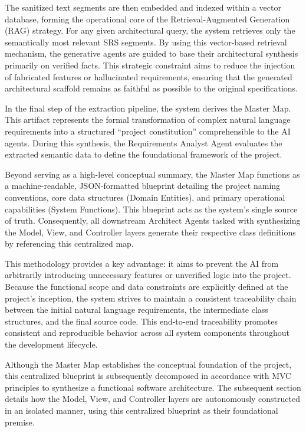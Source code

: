 The sanitized text segments are then embedded and indexed within a vector database, forming the operational core of the Retrieval-Augmented Generation (RAG) strategy. For any given architectural query, the system retrieves only the semantically most relevant SRS segments. By using this vector-based retrieval mechanism, the generative agents are guided to base their architectural synthesis primarily on verified facts. This strategic constraint aims to reduce the injection of fabricated features or hallucinated requirements, ensuring that the generated architectural scaffold remains as faithful as possible to the original specifications.

In the final step of the extraction pipeline, the system derives the Master Map. This artifact represents the formal transformation of complex natural language requirements into a structured ``project constitution'' comprehensible to the AI agents. During this synthesis, the Requirements Analyst Agent evaluates the extracted semantic data to define the foundational framework of the project.

Beyond serving as a high-level conceptual summary, the Master Map functions as a machine-readable, JSON-formatted blueprint detailing the project naming conventions, core data structures (Domain Entities), and primary operational capabilities (System Functions). This blueprint acts as the system's single source of truth. Consequently, all downstream Architect Agents tasked with synthesizing the Model, View, and Controller layers generate their respective class definitions by referencing this centralized map.

This methodology provides a key advantage: it aims to prevent the AI from arbitrarily introducing unnecessary features or unverified logic into the project. Because the functional scope and data constraints are explicitly defined at the project's inception, the system strives to maintain a consistent traceability chain between the initial natural language requirements, the intermediate class structures, and the final source code. This end-to-end traceability promotes consistent and reproducible behavior across all system components throughout the development lifecycle.

Although the Master Map establishes the conceptual foundation of the project, this centralized blueprint is subsequently decomposed in accordance with MVC principles to synthesize a functional software architecture. The subsequent section details how the Model, View, and Controller layers are autonomously constructed in an isolated manner, using this centralized blueprint as their foundational premise.

